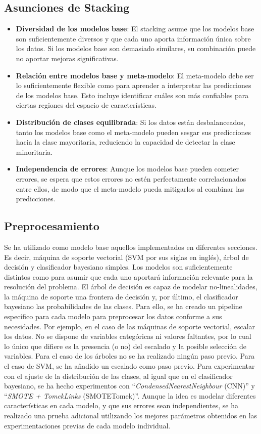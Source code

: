 \documentclass[12pt,letterpaper]{article}
\begin{document}
\subsection{Asunciones de Stacking}
\begin{itemize}
    \item \textbf{Diversidad de los modelos base}: El stacking asume que los modelos base son suficientemente diversos y que cada uno aporta información única sobre los datos. Si los modelos base son demasiado similares, su combinación puede no aportar mejoras significativas.
    \item \textbf{Relación entre modelos base y meta-modelo}: El meta-modelo debe ser lo suficientemente flexible como para aprender a interpretar las predicciones de los modelos base. Esto incluye identificar cuáles son más confiables para ciertas regiones del espacio de características.
    \item \textbf{Distribución de clases equilibrada}: Si los datos están desbalanceados, tanto los modelos base como el meta-modelo pueden sesgar sus predicciones hacia la clase mayoritaria, reduciendo la capacidad de detectar la clase minoritaria.
    \item \textbf{Independencia de errores}: Aunque los modelos base pueden cometer errores, se espera que estos errores no estén perfectamente correlacionados entre ellos, de modo que el meta-modelo pueda mitigarlos al combinar las predicciones.
\end{itemize}
\subsection{Preprocesamiento}
Se ha utilizado como modelo base aquellos implementados en diferentes secciones. Es decir, máquina de soporte vectorial (SVM por sus siglas en inglés), árbol de decisión y clasificador bayesiano simples. 
Los modelos son suficientemente distintos como para asumir que cada uno aportará información relevante para la resolución del problema. El árbol de decisión es capaz de modelar no-linealidades, la máquina de soporte una 
frontera de decisión y, por último, el clasificador bayesiano las probabilidades de las clases.
Para ello, se ha creado un pipeline específico para cada modelo para preprocesar los datos conforme a sus necesidades. Por ejemplo, en el caso de las máquinas de soporte vectorial, escalar los datos. 
No se dispone de variables categóricas ni valores faltantes, por lo cual lo único que difiere es la presencia (o no) del escalado y la posible selección de variables.
Para el caso de los árboles no se ha realizado ningún paso previo. Para el caso de SVM, se ha añadido un escalado como paso previo. 
Para experimentar con el ajuste de la distribución de las clases, al igual que en el clasificador bayesiano, se ha hecho experimentos con ``\textit{CondensedNearestNeighbour} (CNN)'' y ``\textit{SMOTE + TomekLinks} (SMOTETomek)''.
Aunque la idea es modelar diferentes características en cada modelo, y que sus errores sean independientes, se ha realizado una prueba adicional utilizando los mejores parámetros obtenidos en las experimentaciones previas de cada modelo individual.
\end{document}
